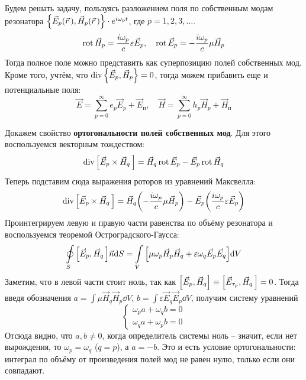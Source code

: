 Будем решать задачу, пользуясь разложением поля по собственным модам резонатора
$\qty{\vec{E}_p(\vec{r}\,),\vec{H}_p(\vec{r}\,)}\cdot e^{i\omega_p t}$, где 
$p=1,2,3, \ldots$.
\begin{equation}
    \operatorname{rot} \vec{H}_p = \frac{i\omega_p}{c}\varepsilon \vec{E}_p, \quad
    \operatorname{rot} \vec{E}_p = -\frac{i\omega_p}{c}\mu \vec{H}_p
\end{equation}
Тогда полное поле можно представить как суперпозицию полей собственных мод. Кроме того, учтём, что $\operatorname{div}\qty{\vec{E}_p,\vec{H}_p}=0$, тогда можем прибавить еще и потенциальные поля:
\begin{equation}
    \label{eq:EH}
    \vec{E} = \sum\limits_{p = 0}^{\infty} e_p \vec{E}_p + \vec{E}_\text{п}, \quad
    \vec{H} = \sum\limits_{p = 0}^{\infty} h_p \vec{H}_p +\vec{H}_\text{п}
\end{equation}

Докажем свойство \textbf{ортогональности полей собственных мод}. Для этого воспользуемся векторным тождеством:
\begin{equation}
    \operatorname{div} \qty[\vec{E}_p \times \vec{H}_q\,]=
    \vec{H}_q \operatorname{rot} \vec{E}_p - \vec{E}_p \operatorname{rot} \vec{H}_q
\end{equation}
Теперь подставим сюда выражения роторов из уравнений Максвелла:
\begin{equation}
    \operatorname{div} \qty[\vec{E}_p \times \vec{H}_q\,]=
    \vec{H}_q \qty(-\frac{i\omega_p}{c}\mu \vec{H}_p)-
    \vec{E}_p \qty(\frac{i\omega_p}{c}\varepsilon \vec{E}_p)
\end{equation}
Проинтегрируем левую и правую части равенства по объёму резонатора и воспользуемся теоремой Остроградского-Гаусса:
\begin{equation}
    \oint\limits_S\qty[\vec{E}_p, \vec{H}_q\,] \vec{n} \dd S =
    \int\limits_V\qty[
        \mu \omega_p \vec{H}_p \vec{H}_q + \varepsilon \omega_q \vec{E}_p \vec{E}_q
    ] \dd V
\end{equation}
Заметим, что в левой части стоит ноль, так как $\qty[\vec{E}_p, \vec{H}_q]\equiv\qty[\vec{E}_{\tau_p},\vec{H}_q\,]=0$. Тогда введя обозначения $a=\int \mu \vec{H}_q \vec{H}_p \dd V$, $b=\int \varepsilon \vec{E}_q \vec{E}_p \dd V$, получим систему уравнений
\begin{equation}
    \left\{\begin{aligned}
        \omega_p a + \omega_q b=0\\
        \omega_q a + \omega_p b = 0
    \end{aligned}\right.
\end{equation}
Отсюда видно, что $a,b \ne 0$, когда определитель системы ноль -- значит, если нет вырождения, то $\omega_p=\omega_q$ ($q=p$), а $a=-b$. Это и есть условие ортогональности: интеграл по объёму от произведения полей мод не равен нулю, только если они совпадают.

